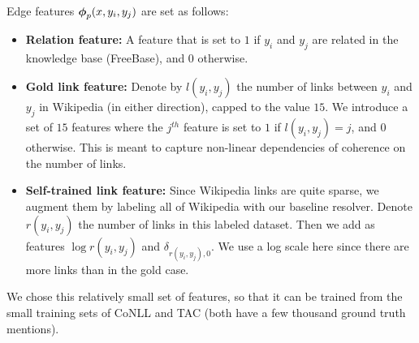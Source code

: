 Edge features $\boldsymbol{\phi}_p(x,y_i,y_j)$ are set as follows:
\begin{itemize}
\item {\bf Relation feature:} A feature that is set to $1$ if $y_i$ and $y_j$ are related in the knowledge base (FreeBase), and $0$ otherwise.
\item {\bf Gold link feature:} Denote by $l(y_i,y_j)$ the number of links between $y_i$ and $y_j$ in Wikipedia (in either direction), capped to the value $15$. We introduce a set of $15$ features where the $j^{th}$ feature is set to $1$ if $l(y_i,y_j) = j$, and $0$ otherwise. This is meant to capture non-linear dependencies of coherence
on the number of links.
\item {\bf Self-trained link feature:} Since Wikipedia links are quite sparse, we augment them by labeling all of Wikipedia with our baseline resolver. %
Denote $r(y_i,y_j)$ the number of links in this labeled dataset. Then we add as features $\log{r(y_i,y_j)}$ and $\delta_{r(y_i,y_j),0}$. We use a log scale here since there are more links than in the gold case. 
\end{itemize}
We chose this relatively small set of features, so that it can be trained from the small training sets of CoNLL and TAC (both have a few thousand ground truth mentions).